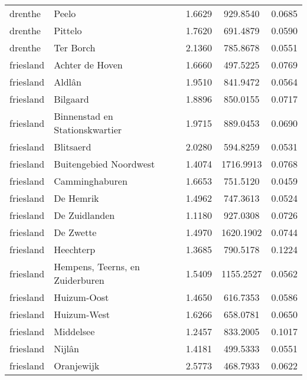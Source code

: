 \begin{longtable}{llccc}
	drenthe       & Peelo                            & 1.6629  & 929.8540  & 0.0685          \\
	drenthe       & Pittelo                          & 1.7620  & 691.4879  & 0.0590          \\
	drenthe       & Ter Borch                        & 2.1360  & 785.8678  & 0.0551          \\
	friesland     & Achter de Hoven                  & 1.6660  & 497.5225  & 0.0769          \\
	friesland     & Aldlân                           & 1.9510  & 841.9472  & 0.0564          \\
	friesland     & Bilgaard                         & 1.8896  & 850.0155  & 0.0717          \\
	friesland     & Binnenstad en Stationskwartier   & 1.9715  & 889.0453  & 0.0690          \\
	friesland     & Blitsaerd                        & 2.0280  & 594.8259  & 0.0531          \\
	friesland     & Buitengebied Noordwest           & 1.4074  & 1716.9913 & 0.0768          \\
	friesland     & Camminghaburen                   & 1.6653  & 751.5120  & 0.0459          \\
	friesland     & De Hemrik                        & 1.4962  & 747.3613  & 0.0524          \\
	friesland     & De Zuidlanden                    & 1.1180  & 927.0308  & 0.0726          \\
	friesland     & De Zwette                        & 1.4970  & 1620.1902 & 0.0744          \\
	friesland     & Heechterp                        & 1.3685  & 790.5178  & 0.1224          \\
	friesland     & Hempens, Teerns, en Zuiderburen  & 1.5409  & 1155.2527 & 0.0562          \\
	friesland     & Huizum-Oost                      & 1.4650  & 616.7353  & 0.0586          \\
	friesland     & Huizum-West                      & 1.6266  & 658.0781  & 0.0650          \\
	friesland     & Middelsee                        & 1.2457  & 833.2005  & 0.1017          \\
	friesland     & Nijlân                           & 1.4181  & 499.5333  & 0.0551          \\
	friesland     & Oranjewijk                       & 2.5773  & 468.7933  & 0.0622          \\

\end{longtable}
